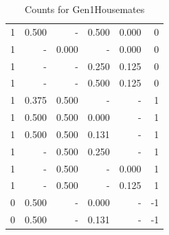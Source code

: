 \documentclass[a4paper]{article}\usepackage{graphicx, color}
\begin{document}
\begin{table}[ht]
\begin{tabular}{rrrrrr}
   \rowcolor{sosoColor} 1 & 0.500 & - & 0.500 & 0.000 & 0 \\ 
  1 & - & 0.000 & - & 0.000 & 0 \\ 
   \rowcolor{sosoColor} 1 & - & - & 0.250 & 0.125 & 0 \\ 
   \rowcolor{sosoColor} 1 & - & - & 0.500 & 0.125 & 0 \\ 
  1 & 0.375 & 0.500 & - & - & 1 \\ 
   \rowcolor{badColor} 1 & 0.500 & 0.500 & 0.000 & - & 1 \\ 
   \rowcolor{badColor} 1 & 0.500 & 0.500 & 0.131 & - & 1 \\ 
   \rowcolor{badColor} 1 & - & 0.500 & 0.250 & - & 1 \\ 
  1 & - & 0.500 & - & 0.000 & 1 \\ 
  1 & - & 0.500 & - & 0.125 & 1 \\ 
   \rowcolor{sosoColor} 0 & 0.500 & - & 0.000 & - & -1 \\ 
   \rowcolor{sosoColor} 0 & 0.500 & - & 0.131 & - & -1 \\ 
   \hline
\end{tabular}
\caption{Counts for Gen1Housemates} 
\end{table}
\end{document}
